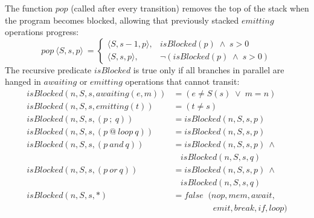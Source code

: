 \documentclass{acm_proc_article-sp}
\newcommand{\LL}{\langle}
\newcommand{\RR}{\rangle}
\newcommand{\rr}[1] {{\textbf{\scriptsize{#1}}}}
\newcommand{\1}{\;}
\newcommand{\2}{\;\;}
\newcommand{\3}{\;\;\;}
\newcommand{\5}{\;\;\;\;\;}
\begin{document}
The function $pop$ (called after every transition) removes the top of the stack 
when the program becomes blocked, allowing that previously stacked $emitting$ 
operations progress:
%
\[
pop~\LL S, s, p \RR~ =
\begin{cases}
    \LL S, s-1, p \RR, &        isBlocked(p) \1\wedge\1 s>0     \\
    \LL S, s,   p \RR, & \neg ( isBlocked(p) \1\wedge\1 s>0 )
\end{cases}
\]
%
The recursive predicate $isBlocked$ is true only if all branches in parallel 
are hanged in $awaiting$ or $emitting$ operations that cannot transit:
%
{\small
\begin{align*}
  isBlocked(n,S,s, awaiting(e,m)) &= (e \neq S(s) \1\vee\1 m = n)   \\
  isBlocked(n,S,s, emitting(t))   &= (t \neq s)                     \\
  isBlocked(n,S,s, (p~;~q))       &= isBlocked(n,S,s,p)             \\
  isBlocked(n,S,s, (p~@~loop~q))  &= isBlocked(n,S,s,p)             \\
  isBlocked(n,S,s, (p~and~q))     &= isBlocked(n,S,s,p)~\wedge \\
                                     &~~~~isBlocked(n,S,s,q)             \\
  isBlocked(n,S,s, (p~or~q))      &= isBlocked(n,S,s,p)~\wedge \\
                                     &~~~~isBlocked(n,S,s,q)             \\
  isBlocked(n,S,s, *)             &= false \2  (nop,mem,await,      \\
                                  &    \5\5\5\2 emit,break,if,loop)   %
\end{align*}
}%
%
\begin{comment}
The first two cases query the $awaiting$ and $emitting$ operations to check if 
they are blocked.
Note that the test predicates are reversed in comparison to the semantic rules 
\rr{awaiting} and \rr{emitting} (i.e. they test when \emph{not} to advance).
Note also that $nop$ is not considered a blocked operation.

An emitted event remains at the top of the stack while there are matching 
$awaiting$ operations---only after the $isBlocked$ predicate becomes true that 
the $pop$ function takes effect.
This behavior provides the desired broadcast communication for events.
\end{comment}
\end{document}

